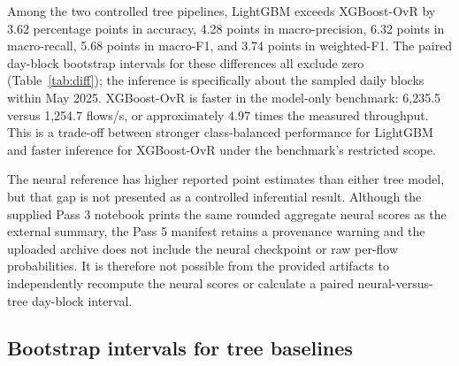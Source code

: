 \documentclass[conference]{IEEEtran}
\begin{document}
\begin{table}[t]
\centering
\caption{May 2025 full-population test results ($N=2{,}359{,}061$). Neural results are external point estimates and are not inferentially compared with the tree rows. Tree throughput includes the April-trained logistic stacker but excludes preprocessing and HDF5 I/O.}
\label{tab:overall}
\end{table}

Among the two controlled tree pipelines, LightGBM exceeds XGBoost-OvR by 3.62 percentage points in accuracy, 4.28 points in macro-precision, 6.32 points in macro-recall, 5.68 points in macro-F1, and 3.74 points in weighted-F1. The paired day-block bootstrap intervals for these differences all exclude zero (Table~\ref{tab:diff}); the inference is specifically about the sampled daily blocks within May 2025. XGBoost-OvR is faster in the model-only benchmark: 6,235.5 versus 1,254.7 flows/s, or approximately 4.97 times the measured throughput. This is a trade-off between stronger class-balanced performance for LightGBM and faster inference for XGBoost-OvR under the benchmark's restricted scope.

The neural reference has higher reported point estimates than either tree model, but that gap is not presented as a controlled inferential result. Although the supplied Pass 3 notebook prints the same rounded aggregate neural scores as the external summary, the Pass 5 manifest retains a provenance warning and the uploaded archive does not include the neural checkpoint or raw per-flow probabilities. It is therefore not possible from the provided artifacts to independently recompute the neural scores or calculate a paired neural-versus-tree day-block interval.

\subsection{Bootstrap intervals for tree baselines}
\end{document}
